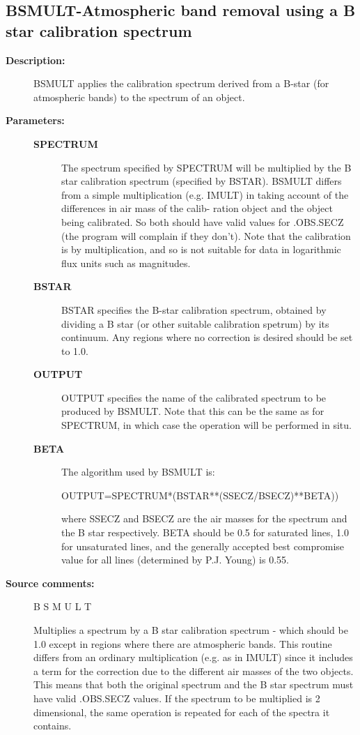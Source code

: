 \subsection{BSMULT-\label{BSMULT}Atmospheric band removal using a B star calibration spectrum}
\begin{description}

\item [\textbf{Description:}]
 BSMULT applies the calibration spectrum derived from a B-star
 (for atmospheric bands) to the spectrum of an object.

\item [\textbf{Parameters:}]
\begin{description}
\item [\textbf{SPECTRUM}]
 The spectrum specified by SPECTRUM will be multiplied
 by the B star calibration spectrum (specified by BSTAR).
 BSMULT differs from a simple multiplication (e.g. IMULT) in
 taking account of the differences in air mass of the calib-
 ration object and the object being calibrated.  So both
 should  have valid values for .OBS.SECZ (the program will
 complain if they don't).  Note that the calibration is by
 multiplication, and so is not suitable for data in
 logarithmic flux units such as magnitudes.
\item [\textbf{BSTAR}]
 BSTAR specifies the B-star calibration spectrum, obtained
 by dividing a B star (or other suitable calibration spetrum)
 by its continuum.  Any regions where no correction is
 desired should be set to 1.0.
\item [\textbf{OUTPUT}]
 OUTPUT specifies the name of the calibrated spectrum to be
 produced by BSMULT.  Note that this can be the same as for
 SPECTRUM, in which case the operation will be performed in
 situ.
\item [\textbf{BETA}]
 The algorithm used by BSMULT is:

    OUTPUT=SPECTRUM*(BSTAR**(SSECZ/BSECZ)**BETA))

 where SSECZ and BSECZ are the air masses for the
 spectrum and the B star respectively.  BETA should
 be 0.5 for saturated lines, 1.0 for unsaturated lines,
 and the generally accepted best compromise value for
 all lines (determined by P.J. Young) is 0.55.
\end{description}

\item [\textbf{Source comments:}]
\begin{terminalv}
 B S M U L T

 Multiplies a spectrum by a B star calibration spectrum - which
 should be 1.0 except in regions where there are atmospheric
 bands.  This routine differs from an ordinary multiplication (e.g.
 as in IMULT) since it includes a term for the correction due
 to the different air masses of the two objects.  This means
 that both the original spectrum and the B star spectrum must
 have valid .OBS.SECZ values.  If the spectrum to be multiplied
 is 2 dimensional, the same operation is repeated for each of
 the spectra it contains.


\end{terminalv}
\end{description}
